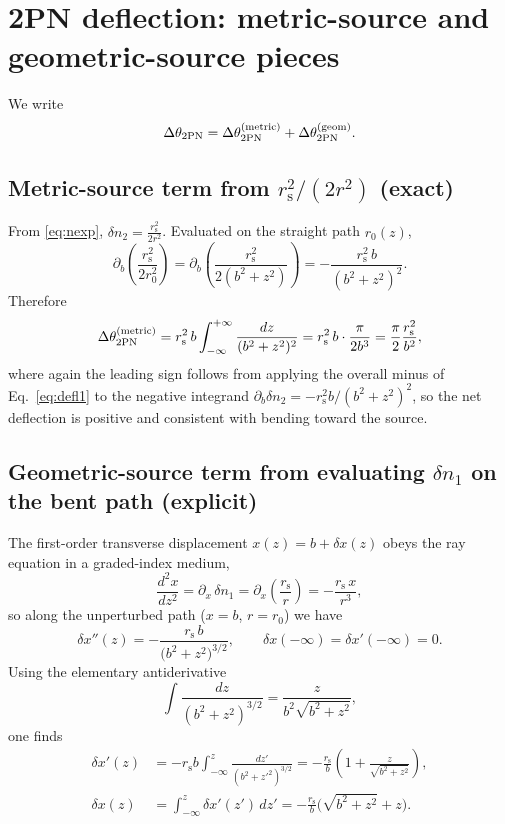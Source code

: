 \documentclass[11pt]{article}
\newcommand{\rs}{r_{\mathrm{s}}}
\begin{document}
\section{2PN deflection: metric-source and geometric-source pieces}\label{sec:2pn}
We write
\begin{equation}
\Delta\theta_{2{\rm PN}}=\Delta\theta_{2{\rm PN}}^{\rm (metric)}+\Delta\theta_{2{\rm PN}}^{\rm (geom)}.
\label{eq:split_app5}
\end{equation}

\subsection{Metric-source term from $\rs^2/(2r^2)$ (exact)}\label{sec:metric_app5}
From \eqref{eq:nexp}, $\delta n_2 = \frac{\rs^2}{2r^2}$. Evaluated on the straight path $r_0(z)$,
\begin{equation}
\partial_b\left(\frac{\rs^2}{2r_0^2}\right)
=\partial_b\left(\frac{\rs^2}{2(b^2+z^2)}\right)
=-\frac{\rs^2\,b}{(b^2+z^2)^2}.
\end{equation}
Therefore
\begin{equation}
\Delta\theta_{2{\rm PN}}^{\rm (metric)}
= \rs^2\,b\int_{-\infty}^{+\infty}\frac{dz}{(b^2+z^2)^2}
= \rs^2\,b\cdot \frac{\pi}{2b^3}
= \frac{\pi}{2}\frac{\rs^2}{b^2},
\label{eq:theta2_metric}
\end{equation}
where again the leading sign follows from applying the
overall minus of Eq.~\eqref{eq:defl1} to the negative
integrand $\partial_b\delta n_2=-\rs^2 b/(b^2+z^2)^2$, so the net deflection is positive and consistent with bending toward the source.

\subsection{Geometric-source term from evaluating $\delta n_1$ on the bent path (explicit)}\label{sec:geom}
The first-order transverse displacement $x(z)=b+\delta x(z)$ obeys the ray equation in a graded-index medium,
\begin{equation}
\frac{d^2x}{dz^2}=\partial_x\,\delta n_1=\partial_x\!\left(\frac{\rs}{r}\right)
=-\frac{\rs\,x}{r^3},
\end{equation}
so along the unperturbed path ($x=b$, $r=r_0$) we have
\begin{equation}
\delta x''(z)=-\frac{\rs\,b}{\big(b^2+z^2\big)^{3/2}},
\qquad
\delta x(-\infty)=\delta x'(-\infty)=0.
\label{eq:dxeq}
\end{equation}
Using the elementary antiderivative
\begin{equation}
\int \frac{dz}{(b^2+z^2)^{3/2}}=\frac{z}{b^2\sqrt{b^2+z^2}},
\end{equation}
one finds
\begin{align}
\delta x'(z) &=
-\rs b\int_{-\infty}^{z}\frac{dz'}{(b^2+z'^2)^{3/2}}
=-\frac{\rs}{b}\left(1+\frac{z}{\sqrt{b^2+z^2}}\right),\\
\delta x(z) &= \int_{-\infty}^{z}\delta x'(z')\,dz'
=-\frac{\rs}{b}\Big(\sqrt{b^2+z^2}+z\Big).
\label{eq:dxsol}
\end{align}
\end{document}
